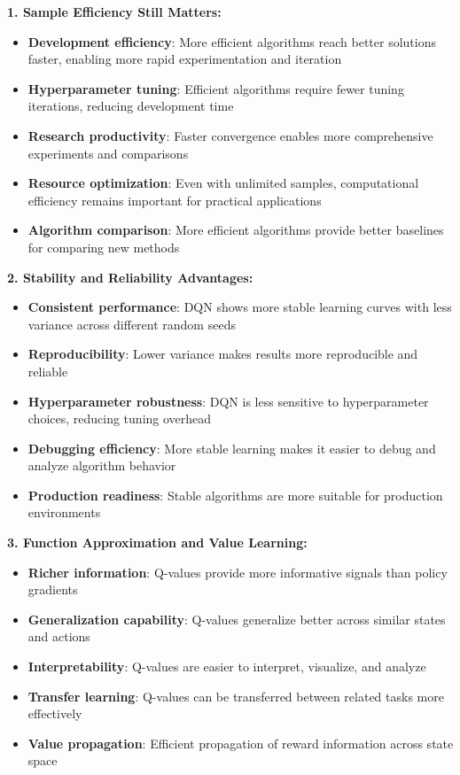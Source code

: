 \documentclass[12pt]{article}
\begin{document}
{{{\textbf{1. Sample Efficiency Still Matters:}
\begin{itemize}
    \item \textbf{Development efficiency}: More efficient algorithms reach better solutions faster, enabling more rapid experimentation and iteration
    \item \textbf{Hyperparameter tuning}: Efficient algorithms require fewer tuning iterations, reducing development time
    \item \textbf{Research productivity}: Faster convergence enables more comprehensive experiments and comparisons
    \item \textbf{Resource optimization}: Even with unlimited samples, computational efficiency remains important for practical applications
    \item \textbf{Algorithm comparison}: More efficient algorithms provide better baselines for comparing new methods
\end{itemize}

\textbf{2. Stability and Reliability Advantages:}
\begin{itemize}
    \item \textbf{Consistent performance}: DQN shows more stable learning curves with less variance across different random seeds
    \item \textbf{Reproducibility}: Lower variance makes results more reproducible and reliable
    \item \textbf{Hyperparameter robustness}: DQN is less sensitive to hyperparameter choices, reducing tuning overhead
    \item \textbf{Debugging efficiency}: More stable learning makes it easier to debug and analyze algorithm behavior
    \item \textbf{Production readiness}: Stable algorithms are more suitable for production environments
\end{itemize}

\textbf{3. Function Approximation and Value Learning:}
\begin{itemize}
    \item \textbf{Richer information}: Q-values provide more informative signals than policy gradients
    \item \textbf{Generalization capability}: Q-values generalize better across similar states and actions
    \item \textbf{Interpretability}: Q-values are easier to interpret, visualize, and analyze
    \item \textbf{Transfer learning}: Q-values can be transferred between related tasks more effectively
    \item \textbf{Value propagation}: Efficient propagation of reward information across state space
\end{itemize}

}}}
\end{document}
